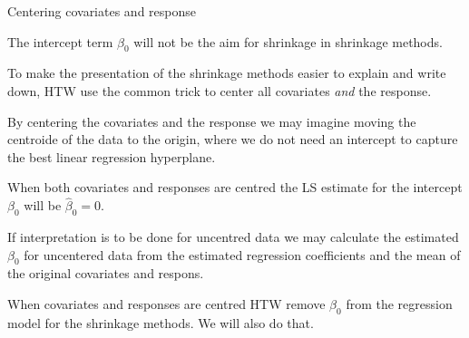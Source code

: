 \documentclass[
  ignorenonframetext,
]{beamer}
\begin{document}
\begin{frame}

\begin{block}{Centering covariates and response}

The intercept term \(\beta_0\) will not be the aim for shrinkage in
shrinkage methods.

To make the presentation of the shrinkage methods easier to explain and
write down, HTW use the common trick to center all covariates \emph{and}
the response.

By centering the covariates and the response we may imagine moving the
centroide of the data to the origin, where we do not need an intercept
to capture the best linear regression hyperplane.

When both covariates and responses are centred the LS estimate for the
intercept \(\beta_0\) will be \(\hat{\beta}_0=0\).

If interpretation is to be done for uncentred data we may calculate the
estimated \(\beta_0\) for uncentered data from the estimated regression
coefficients and the mean of the original covariates and respons.

When covariates and responses are centred HTW remove \(\beta_0\) from
the regression model for the shrinkage methods. We will also do that.

\end{block}

\end{frame}
\end{document}
